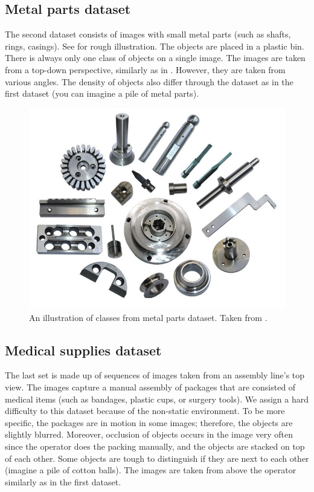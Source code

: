 \subsection*{Metal parts dataset}
The second dataset consists of images with small
metal parts (such as shafts, rings, casings). See  for
rough illustration. The objects are placed in a plastic bin. There is always
only one class of objects on a single image. The images are taken from a
top-down perspective, similarly as in . However, they
are taken from various angles. The density of objects also differ through the
dataset as in the first dataset (you can imagine a pile of metal parts).

\begin{figure}[ht]
	\centering
	\includegraphics[height=0.35\linewidth]{Sources/Figures/metal_parts.jpg}
	\caption{An illustration of classes from metal parts dataset. Taken from
		\cite{parts}.}
	\label{fig:parts}
\end{figure}

\subsection*{Medical supplies dataset}
The last set is made up of sequences of images
taken from an assembly line's top view. The images capture a manual assembly of
packages that are consisted of medical items (such as bandages, plastic cups, or
surgery tools). We assign a hard difficulty to this dataset because of the
non-static environment. To be more specific, the packages are in motion in some
images; therefore, the objects are slightly blurred. Moreover, occlusion of
objects occurs in the image very often since the operator does the packing
manually, and the objects are stacked on top of each other. Some objects are
tough to distinguish if they are next to each other (imagine a pile of cotton
balls). The images are taken from above the operator similarly as in the first
dataset.

